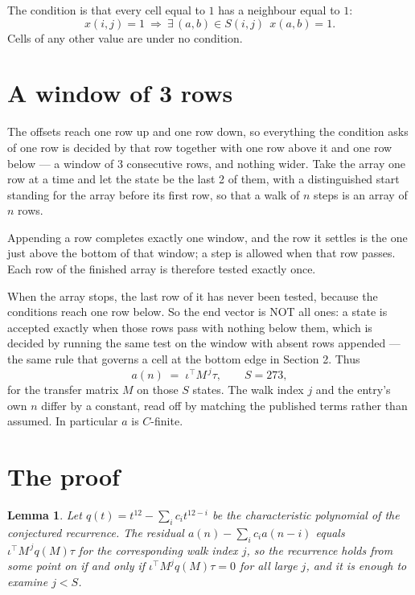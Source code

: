 \documentclass[11pt,a4paper]{article}
\theoremstyle{plain}
\newtheorem{lemma}[theorem]{Lemma}
\theoremstyle{definition}
\begin{document}
The condition is that every cell equal to $1$ has a neighbour equal to $1$:
\[
x(i,j)=1\ \Longrightarrow\ \exists\,(a,b)\in S(i,j)\ \ x(a,b)=1 .
\]
Cells of any other value are under no condition.

\section{A window of 3 rows}

The offsets reach one row up and one row down, so everything the condition asks of one row is
decided by that row together with one row above it and one row below --- a window of
$3$ consecutive rows, and nothing wider. Take the array one row at a time and
let the state be the last 2 of them, with a distinguished start standing for the array before its
first row, so that a walk of $n$ steps is an array of $n$ rows.

Appending a row completes exactly one window, and the row it settles is the one just above the bottom of that window; a step is
allowed when that row passes. Each row of the finished array is therefore tested exactly once.

When the array stops, the last row of it has never been tested, because the
conditions reach one row below. So the end vector is NOT all ones: a state is accepted exactly when
those rows pass with nothing below them, which is decided by running the same test on the window
with absent rows appended --- the same rule that governs a cell at the bottom edge in
Section 2.
Thus
\[
a(n)\;=\;\iota^{\!\top}M^{\,j}\tau ,\qquad S=273,
\]
for the transfer matrix $M$ on those $S$ states. The walk index $j$ and the entry's own $n$
differ by a constant, read off by matching the published terms rather than assumed. In
particular $a$ is $C$-finite.

\section{The proof}

\begin{lemma}\label{lem:crit}
Let $q(t)=t^{12}-\sum_i c_it^{12-i}$ be the characteristic polynomial of the
conjectured recurrence. The residual $a(n)-\sum_ic_ia(n-i)$ equals
$\iota^{\!\top}M^{\,j}q(M)\tau$ for the corresponding walk index $j$, so the recurrence
holds from some point on if and only if $\iota^{\!\top}M^{j}q(M)\tau=0$ for all large $j$,
and it is enough to examine $j<S$.
\end{lemma}
\end{document}
